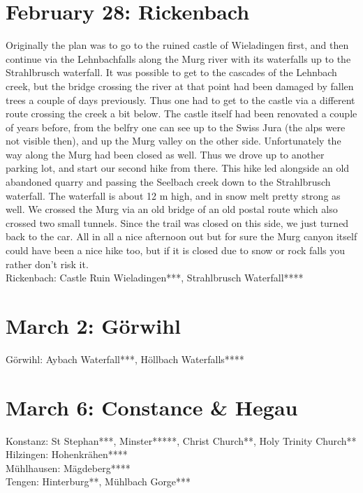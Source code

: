 \section{February 28: Rickenbach}
\label{2021:Rickenbach}

Originally the plan was to go to the ruined castle of Wieladingen first, and then continue via the Lehnbachfalls along the Murg river with its waterfalls up to the Strahlbrusch waterfall. It was possible to get to the cascades of the Lehnbach creek, but the bridge crossing the river at that point had been damaged by fallen trees a couple of days previously. Thus one had to get to the castle via a different route crossing the creek a bit below. The castle itself had been renovated a couple of years before, from the belfry one can see up to the Swiss Jura (the alps were not visible then), and up the Murg valley on the other side. Unfortunately the way along the Murg had been closed as well. Thus we drove up to another parking lot, and start our second hike from there. This hike led alongside an old abandoned quarry and passing the Seelbach creek down to the Strahlbrusch waterfall. The waterfall is about 12 m high, and in snow melt pretty strong as well. We crossed the Murg via an old bridge of an old postal route which also crossed two small tunnels. Since the trail was closed on this side, we just turned back to the car. All in all a nice afternoon out but for sure the Murg canyon itself could have been a nice hike too, but if it is closed due to snow or rock falls you rather don't risk it.\\

Rickenbach: Castle Ruin Wieladingen***, Strahlbrusch Waterfall****

\section{March 2: G\"orwihl}
\label{2021:Goerwihl}

G\"orwihl: Aybach Waterfall***, H\"ollbach Waterfalls****

\section{March 6: Constance \& Hegau}
\label{2021:Konstanz}

Konstanz: St Stephan***, Minster*****, Christ Church**, Holy Trinity Church**\\
Hilzingen: Hohenkr\"ahen****\\
M\"uhlhausen: M\"agdeberg****\\
Tengen: Hinterburg**, M\"uhlbach Gorge***

